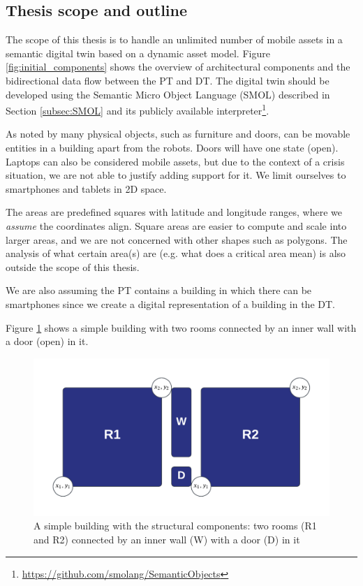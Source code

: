 \documentclass{article}
\begin{document}
\subsection{Thesis scope and outline}\label{subsec:Scope}
The scope of this thesis is to handle an unlimited number of mobile assets in a semantic digital twin based on a dynamic asset model. Figure \ref{fig:initial_components} shows the overview of architectural components and the bidirectional data flow between the PT and DT. The digital twin should be developed using the Semantic Micro Object Language (SMOL) described in Section \ref{subsec:SMOL} and its publicly available interpreter\footnote{\url{https://github.com/smolang/SemanticObjects}}.

As noted by \citeauthor{pauwels_live_2023} many physical objects, such as furniture and doors, can be movable entities in a building apart from the robots. Doors will have one state (open). Laptops can also be considered mobile assets, but due to the context of a crisis situation, we are not able to justify adding support for it. We limit ourselves to smartphones and tablets in 2D space.  

The areas are predefined squares with latitude and longitude ranges, where we \emph{assume} the coordinates align. Square areas are easier to compute and scale into larger areas, and we are not concerned with other shapes such as polygons. The analysis of what certain area(s) are (e.g. what does a critical area mean) is also outside the scope of this thesis.

We are also assuming the PT contains a building in which there can be smartphones since we create a digital representation of a building in the DT.

Figure \ref{fig:simple_building} shows a simple building with two rooms connected by an inner wall with a door (open) in it.

\begin{figure}[H]
    \centering
    \includegraphics[scale=0.3]{graphics/simple_building.png}
    \caption{A simple building with the structural components: two rooms (R1 and R2) connected by an inner wall (W) with a door (D) in it}
    \label{fig:simple_building}
\end{figure}
\end{document}
